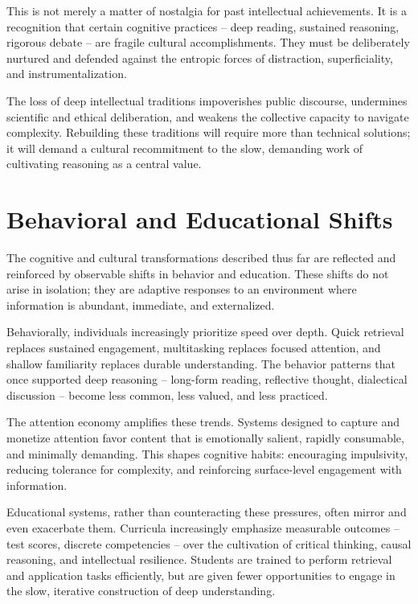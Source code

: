 This is not merely a matter of nostalgia for past intellectual
achievements. It is a recognition that certain cognitive practices --
deep reading, sustained reasoning, rigorous debate -- are fragile
cultural accomplishments. They must be deliberately nurtured and
defended against the entropic forces of distraction, superficiality, and
instrumentalization.

The loss of deep intellectual traditions impoverishes public discourse,
undermines scientific and ethical deliberation, and weakens the
collective capacity to navigate complexity. Rebuilding these traditions
will require more than technical solutions; it will demand a cultural
recommitment to the slow, demanding work of cultivating reasoning as a
central value.


\section{Behavioral and Educational Shifts}

The cognitive and cultural transformations described thus far are
reflected and reinforced by observable shifts in behavior and education.
These shifts do not arise in isolation; they are adaptive responses to
an environment where information is abundant, immediate, and
externalized.

Behaviorally, individuals increasingly prioritize speed over depth.
Quick retrieval replaces sustained engagement, multitasking replaces
focused attention, and shallow familiarity replaces durable
understanding. The behavior patterns that once supported deep reasoning
-- long-form reading, reflective thought, dialectical discussion -- become
less common, less valued, and less practiced.

The attention economy amplifies these trends. Systems designed to
capture and monetize attention favor content that is emotionally
salient, rapidly consumable, and minimally demanding. This shapes
cognitive habits: encouraging impulsivity, reducing tolerance for
complexity, and reinforcing surface-level engagement with information.

Educational systems, rather than counteracting these pressures, often
mirror and even exacerbate them. Curricula increasingly emphasize
measurable outcomes -- test scores, discrete competencies -- over the
cultivation of critical thinking, causal reasoning, and intellectual
resilience. Students are trained to perform retrieval and application
tasks efficiently, but are given fewer opportunities to engage in the
slow, iterative construction of deep understanding.

